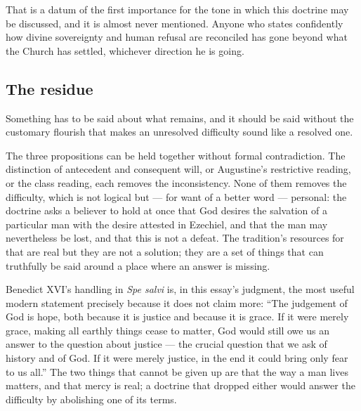 That is a datum of the first importance for the tone in which this doctrine may be discussed, and it is almost never mentioned. Anyone who states confidently how divine sovereignty and human refusal are reconciled has gone beyond what the Church has settled, whichever direction he is going.

\subsection{The residue}

Something has to be said about what remains, and it should be said without the customary flourish that makes an unresolved difficulty sound like a resolved one.

The three propositions can be held together without formal contradiction. The distinction of antecedent and consequent will, or Augustine's restrictive reading, or the class reading, each removes the inconsistency. None of them removes the difficulty, which is not logical but --- for want of a better word --- personal: the doctrine asks a believer to hold at once that God desires the salvation of a particular man with the desire attested in Ezechiel, and that the man may nevertheless be lost, and that this is not a defeat. The tradition's resources for that are real but they are not a solution; they are a set of things that can truthfully be said around a place where an answer is missing.

Benedict XVI's handling in \emph{Spe salvi} is, in this essay's judgment, the most useful modern statement precisely because it does not claim more: ``The judgement of God is hope, both because it is justice and because it is grace. If it were merely grace, making all earthly things cease to matter, God would still owe us an answer to the question about justice --- the crucial question that we ask of history and of God. If it were merely justice, in the end it could bring only fear to us all.'' The two things that cannot be given up are that the way a man lives matters, and that mercy is real; a doctrine that dropped either would answer the difficulty by abolishing one of its terms.

